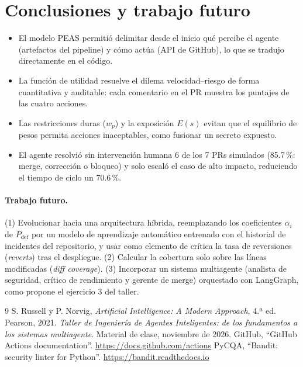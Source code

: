 \documentclass[11pt,a4paper]{article}
\newcommand{\Pdef}{P_{\text{def}}}
\begin{document}
\section{Conclusiones y trabajo futuro}
\label{sec:conclusiones}

\begin{itemize}[leftmargin=*]
\item El modelo PEAS permitió delimitar desde el inicio qué percibe el agente (artefactos del
      pipeline) y cómo actúa (API de GitHub), lo que se tradujo directamente en el código.
\item La función de utilidad resuelve el dilema velocidad--riesgo de forma cuantitativa y auditable:
      cada comentario en el PR muestra los puntajes de las cuatro acciones.
\item Las restricciones duras ($w_p$) y la exposición $E(s)$ evitan que el equilibrio de pesos
      permita acciones inaceptables, como fusionar un secreto expuesto.
\item El agente resolvió sin intervención humana 6 de los 7 PRs simulados (85.7\,\%: merge,
      corrección o bloqueo) y solo escaló el caso de alto impacto, reduciendo el tiempo de ciclo un 70.6\,\%.
\end{itemize}

\paragraph{Trabajo futuro.}
(1) Evolucionar hacia una arquitectura híbrida, reemplazando los coeficientes $\alpha_i$ de
$\Pdef$ por un modelo de aprendizaje automático entrenado con el historial de incidentes del
repositorio, y usar como elemento de crítica la tasa de reversiones (\textit{reverts}) tras el
despliegue.
(2) Calcular la cobertura solo sobre las líneas modificadas (\textit{diff coverage}).
(3) Incorporar un sistema multiagente (analista de seguridad, crítico de rendimiento y gerente de
merge) orquestado con LangGraph, como propone el ejercicio 3 del taller.

\begin{thebibliography}{9}
 S. Russell y P. Norvig, \textit{Artificial Intelligence: A Modern Approach}, 4.ª ed. Pearson, 2021.
 \textit{Taller de Ingeniería de Agentes Inteligentes: de los fundamentos a los sistemas multiagente}. Material de clase, noviembre de 2026.
 GitHub, ``GitHub Actions documentation''. \url{https://docs.github.com/actions}
 PyCQA, ``Bandit: security linter for Python''. \url{https://bandit.readthedocs.io}
\end{thebibliography}
\end{document}
